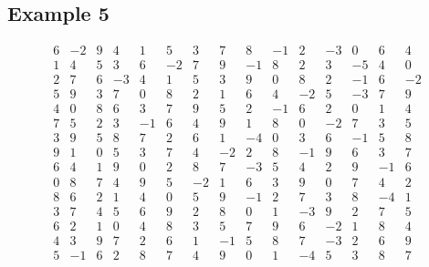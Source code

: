 \documentclass[a4paper, 14pt]{article}
\begin{document}
\subsection*{Example 5}
\[
\begin{array}{ccccccccccccccc}
6 & -2 & 9 & 4 & 1 & 5 & 3 & 7 & 8 & -1 & 2 & -3 & 0 & 6 & 4 \\
1 & 4 & 5 & 3 & 6 & -2 & 7 & 9 & -1 & 8 & 2 & 3 & -5 & 4 & 0 \\
2 & 7 & 6 & -3 & 4 & 1 & 5 & 3 & 9 & 0 & 8 & 2 & -1 & 6 & -2 \\
5 & 9 & 3 & 7 & 0 & 8 & 2 & 1 & 6 & 4 & -2 & 5 & -3 & 7 & 9 \\
4 & 0 & 8 & 6 & 3 & 7 & 9 & 5 & 2 & -1 & 6 & 2 & 0 & 1 & 4 \\
7 & 5 & 2 & 3 & -1 & 6 & 4 & 9 & 1 & 8 & 0 & -2 & 7 & 3 & 5 \\
3 & 9 & 5 & 8 & 7 & 2 & 6 & 1 & -4 & 0 & 3 & 6 & -1 & 5 & 8 \\
9 & 1 & 0 & 5 & 3 & 7 & 4 & -2 & 2 & 8 & -1 & 9 & 6 & 3 & 7 \\
6 & 4 & 1 & 9 & 0 & 2 & 8 & 7 & -3 & 5 & 4 & 2 & 9 & -1 & 6 \\
0 & 8 & 7 & 4 & 9 & 5 & -2 & 1 & 6 & 3 & 9 & 0 & 7 & 4 & 2 \\
8 & 6 & 2 & 1 & 4 & 0 & 5 & 9 & -1 & 2 & 7 & 3 & 8 & -4 & 1 \\
3 & 7 & 4 & 5 & 6 & 9 & 2 & 8 & 0 & 1 & -3 & 9 & 2 & 7 & 5 \\
6 & 2 & 1 & 0 & 4 & 8 & 3 & 5 & 7 & 9 & 6 & -2 & 1 & 8 & 4 \\
4 & 3 & 9 & 7 & 2 & 6 & 1 & -1 & 5 & 8 & 7 & -3 & 2 & 6 & 9 \\
5 & -1 & 6 & 2 & 8 & 7 & 4 & 9 & 0 & 1 & -4 & 5 & 3 & 8 & 7
\end{array}
\]
\par
\vspace{1em}
\end{document}
